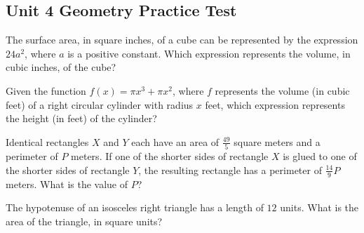 \subsection*{Unit 4 Geometry Practice Test}

\setcounter{questionnum}{0}

\noindent\markforreview
\vspace{1em}

The surface area, in square inches, of a cube can be represented by the expression $24a^2$, where $a$ is a positive constant. Which expression represents the volume, in cubic inches, of the cube?


\vspace{2em}

\noindent\markforreview
\vspace{1em}

Given the function $f(x) = \pi x^3 + \pi x^2$, where $f$ represents the volume (in cubic feet) of a right circular cylinder with radius $x$ feet, which expression represents the height (in feet) of the cylinder?


\vspace{2em}

\noindent\markforreview
\vspace{1em}

Identical rectangles $X$ and $Y$ each have an area of $\frac{49}{5}$ square meters and a perimeter of $P$ meters. If one of the shorter sides of rectangle $X$ is glued to one of the shorter sides of rectangle $Y$, the resulting rectangle has a perimeter of $\frac{14}{9}P$ meters. What is the value of $P$?

\vspace{2em}

\noindent\markforreview
\vspace{1em}

The hypotenuse of an isosceles right triangle has a length of $12$ units. What is the area of the triangle, in square units?


\vspace{2em}

\noindent\markforreview
\vspace{1em}

